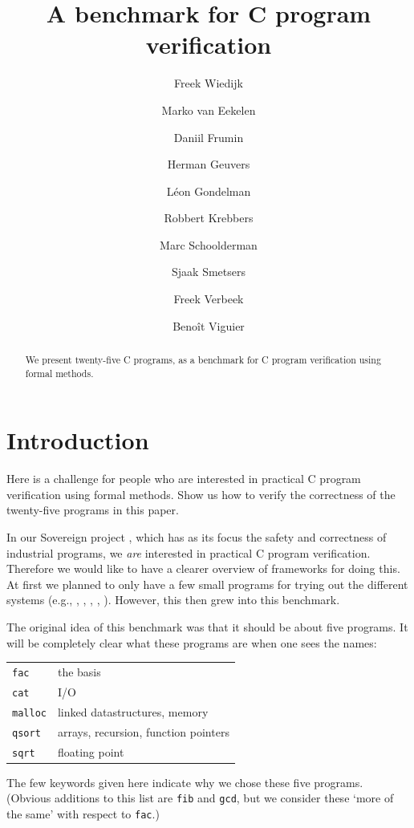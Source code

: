 \documentclass{article}
\begin{document}
\title{A benchmark for C program verification}
\author{Freek Wiedijk \and
Marko van Eekelen \and
Daniil Frumin \and
Herman Geuvers \and
L\'eon Gondelman \and
Robbert Krebbers \and
Marc Schoolderman \and
Sjaak Smetsers \and
Freek Verbeek \and
Beno\^it Viguier
}
\maketitle

\begin{abstract}
\noindent
We present twenty-five C programs, as a benchmark for
C program verification using formal methods.
\end{abstract}

\section{Introduction}

Here is a challenge for people who are interested in practical C program verification using formal methods.
Show us how to verify the correctness of the twenty-five programs in this paper.

In our Sovereign project \cite{eek:geu:sme:wie:14}, which has as its focus the safety and correctness of industrial programs, we \emph{are} interested in practical C program verification.
Therefore we would like to have a clearer overview of frameworks for doing this.
At first we planned to only have a few small programs for trying out the different systems (e.g., \cite{app:11}, \cite{dah:mos:san:tob:sch:09}, \cite{gre:and:klei:12}, \cite{jac:sma:phi:vog:pen:pie:11}, \cite{mar:07}).
However, this then grew into this benchmark.

The original idea of this benchmark was that it should be about five programs.
It will be completely clear what these programs are when one sees the names:
\begin{center}
\begin{tabular}{ll}
\lstinline|fac| & the basis \\
\lstinline|cat| & I/O \\
\lstinline|malloc| & linked datastructures, memory \\
\lstinline|qsort| & arrays, recursion, function pointers \\
\lstinline|sqrt| & floating point
\end{tabular}
\end{center}
The few keywords given here indicate why we chose these five programs.
(Obvious additions to this list are \texttt{fib} and \texttt{gcd}, but we consider these `more of the same'
with respect to \texttt{fac}.)
\end{document}
